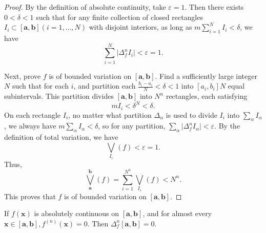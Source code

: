 \documentclass{ijclclp}
\begin{document}
\begin{proof}
    By the definition of absolute continuity, take \(\varepsilon=1\). Then there exists \(0<\delta<1\) such that for any finite collection of closed rectangles \(I_i\subset[\boldsymbol{a},\boldsymbol{b}](i=1,\dots,N)\) with disjoint interiors, as long as \(m\sum\limits_{i=1}^{N}I_i<\delta\), we have
    \[\sum_{i=1}^{N}\lvert\Delta_f^nI_i\rvert<\varepsilon=1.\]
    
    Next, prove \(f\) is of bounded variation on \([\boldsymbol{a},\boldsymbol{b}]\). Find a sufficiently large integer \(N\) such that for each \(i\), and partition each \(\frac{b_i-a_i}{N}<\delta<1\) into \([a_i,b_i]N\) equal subintervals. This partition divides \([\boldsymbol{a},\boldsymbol{b}]\) into \(N^n\) rectangles, each satisfying 
    \[mI_i<\delta^N<\delta.\]
    On each rectangle \(I_i\), no matter what partition \(\Delta_\alpha\) is used to divide \(I_i\) into \(\sum\limits_{\alpha} I_\alpha\), we always have \(m\sum\limits_{\alpha} I_\alpha<\delta\), so for any partition, \(\sum\limits_{\alpha}\lvert \Delta_f^nI_\alpha\rvert<\varepsilon\). By the definition of total variation, we have
    \[\bigvee_{I_i}(f)<\varepsilon=1.\]
    Thus,
    \[\bigvee_{\boldsymbol{a}}^{\boldsymbol{b}}(f)=\sum_{i=1}^{N^n}\bigvee_{I_i}(f)<N^n.\]
    This proves that \(f\) is of bounded variation on \([\boldsymbol{a},\boldsymbol{b}]\).
\end{proof}
\begin{lemma} 
    If \(f(\boldsymbol{x})\) is absolutely continuous on \([\boldsymbol{a},\boldsymbol{b}]\), and for almost every \(\boldsymbol{x}\in [\boldsymbol{a},\boldsymbol{b}],f^{(n)}(\boldsymbol{x})=0\). Then \(\Delta_f^n[\boldsymbol{a},\boldsymbol{b}]=0\).
\end{lemma}
\end{document}
